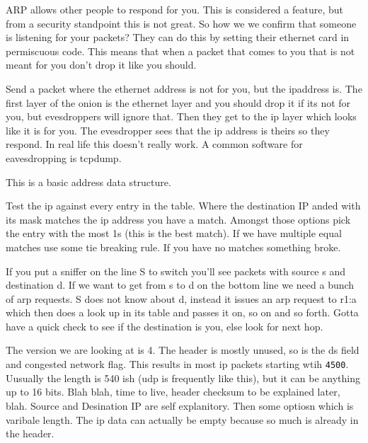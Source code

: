 \documentclass[12pt]{article}
\begin{document}

ARP allows other people to respond for you. This is considered a feature, but from a security standpoint this is not great. So how we we confirm that someone is listening for your packets? They can do this by setting their ethernet card in permiscuous code. This means that when a packet that comes to you that is not meant for you don't drop it like you should.


Send a packet where the ethernet address is not for you, but the ipaddress is. The first layer of the onion is the ethernet layer and you should drop it if its not for you, but evesdroppers will ignore that. Then they get to the ip layer which looks like it is for you. The evesdropper sees that the ip address is theirs so they respond. In real life this doesn't really work. A common software for eavesdropping is tcpdump.


This is a basic address data structure.



Test the ip against every entry in the table. Where the destination IP anded with its mask matches the ip address you have a match. Amongst those options pick the entry with the most 1s (this is the best match). If we have multiple equal matches use some tie breaking rule. If you have no matches something broke.


If you put a sniffer on the line S to switch you'll see packets with source s and destination d. If we want to get from s to d on the bottom line we need a bunch of arp requests. S does not know about d, instead it issues an arp request to r1:a which then does a look up in its table and passes it on, so on and so forth. Gotta have a quick check to see if the destination is you, else look for next hop.


The version we are looking at is 4. The header is mostly unused, so is the ds field and congested network flag. This results in most ip packets starting wtih \texttt{4500}. Uusually the length is 540 ish (udp is frequently like this), but it can be anything up to 16 bits. Blah blah, time to live, header checksum to be explained later, blah. Source and Desination IP are self explanitory. Then some optiosn which is varibale length. The ip data can actually be empty because so much is already in the header.
\end{document}
